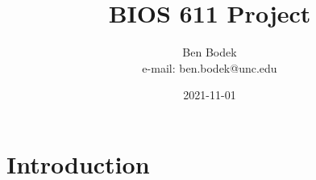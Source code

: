 \documentclass{article}
\begin{document}
\title{BIOS 611 Project}
\author{Ben Bodek \\ e-mail: ben.bodek@unc.edu}
\date{2021-11-01}
\maketitle

\section{Introduction}
\end{document}
